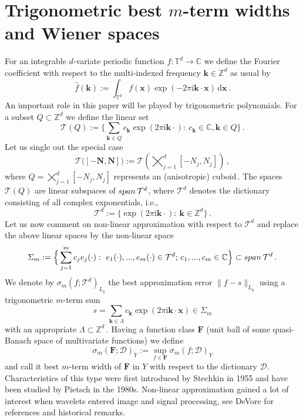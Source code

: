 \documentclass[11pt,reqno]{article}
\numberwithin{equation}{section}
\theoremstyle{definition}
\theoremstyle{plain}
\newcommand{\zz}{\ensuremath{\mathbb{Z}}}
\newcommand{\tor}{\ensuremath{\mathbb{T}}}
\newcommand{\bk}{\ensuremath{\mathbf k}}
\newcommand{\bN}{\ensuremath{\mathbf N}}
\newcommand{\bx}{\ensuremath{\mathbf x}}
\newcommand{\Span}{{\rm span \, }}
\begin{document}
\section{Trigonometric best $m$-term widths and Wiener spaces}
For an integrable $d$-variate periodic function $f:\tor^d \to \mathbb{C}$ we define the Fourier coefficient with respect to the multi-indexed frequency $\mathbf{k}\in \zz^d$ as usual by
$$
    \hat{f}(\mathbf{k}) := \int_{\tor^d} f(\bx)\exp(-2\pi \mathrm{i} \bk\cdot \bx) \, \mathrm{d} \bx\,.
$$
An important role in this paper will be played by trigonometric polynomials. For a subset $Q \subset \zz^d$ we define the linear set
$$
    \mathcal{T}(Q):=\Big\{\sum\limits_{\bk \in Q} c_{\bk} \exp(2\pi \mathrm{i} \bk\cdot) :~c_{\bk} \in \mathbb{C}, \bk \in Q\Big\}\,.
$$
Let us single out the special case 
$$
   \mathcal{T}\big([-\bN,\bN]\big) := \mathcal{T}(\bigtimes_{j =1}^d [-N_j,N_j])\,,
$$
where $Q = \bigtimes_{j =1}^d [-N_j,N_j]$ represents an (anisotropic) cuboid\,. The spaces  $\mathcal{T}(Q)$ are linear subspaces of $\Span \mathcal{T}^d$, where $\mathcal{T}^d$ denotes the dictionary consisting of all complex exponentials, i.e.,
$$
    \mathcal{T}^d := \Big\{\exp(2\pi \mathrm{i} \mathbf{k}\cdot) :~\mathbf{k} \in \mathbb{Z}^d\Big\}\,.
$$
Let us now comment on non-linear approximation with respect to $\mathcal{T}^d$ and replace the above linear spaces by the non-linear space 
\begin{equation}
   \Sigma_m:=\Big\{\sum\limits_{j=1}^m c_j e_j(\cdot) :~e_1(\cdot),...,e_m(\cdot) \in \mathcal{T}^d; \, c_1,...,c_m \in \mathbb{C}\Big\} \subset \Span \mathcal{T}^d\,.
\end{equation}   
We denote by $\sigma_m(f;\mathcal{T}^d)_{L_q}$ the best approximation error $\|f-s\|_{L_q}$ using a trigonometric $m$-term sum 
$$
        s = \sum\limits_{\mathbf{k} \in \Lambda} c_{\mathbf{k}}\exp(2\pi \mathrm{i} \mathbf{k} \cdot \mathbf{x})\in \Sigma_m
$$
with an appropriate $\Lambda \subset \zz^d$\,.
Having a function class $\mathbf{F}$ (unit ball of some quasi-Banach space of multivariate functions) we define 
\begin{equation}\label{eq3}
    \sigma_m(\mathbf{F};\mathcal{D})_Y := \sup\limits_{f \in \mathbf{F}}\sigma_m(f;\mathcal{D})_Y
\end{equation}
and call it best $m$-term width of $\mathbf{F}$ in $Y$ with respect to the dictionary $\mathcal{D}$. Characteristics of this type were first introduced by Stechkin \cite{Ste55} in 1955 and have been studied by Pietsch \cite{Pie81} in the 1980s. Non-linear approximation gained a lot of interest when wavelets entered image and signal processing, see DeVore \cite{DeV98} for references and historical remarks. %
\end{document}
